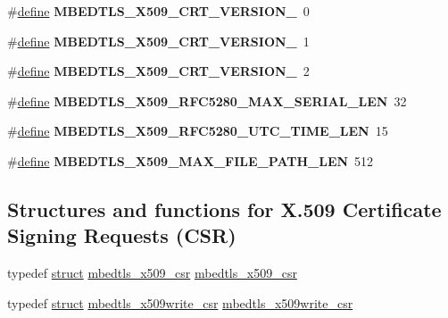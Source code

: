 \begin{DoxyCompactItemize}
$$\#\hyperlink{structdefine}{define} {\bfseries M\+B\+E\+D\+T\+L\+S\+\_\+\+X509\+\_\+\+C\+R\+T\+\_\+\+V\+E\+R\+S\+I\+O\+N\+\_}~0
\item 
\mbox{\label{group__x509__module_ga46a0b7f3a4c1f279f609fd8ea304c192}} 
\#\hyperlink{structdefine}{define} {\bfseries M\+B\+E\+D\+T\+L\+S\+\_\+\+X509\+\_\+\+C\+R\+T\+\_\+\+V\+E\+R\+S\+I\+O\+N\+\_}~1
\item 
\mbox{\label{group__x509__module_ga7c22a610222ea94e1faf96223bc5d9a4}} 
\#\hyperlink{structdefine}{define} {\bfseries M\+B\+E\+D\+T\+L\+S\+\_\+\+X509\+\_\+\+C\+R\+T\+\_\+\+V\+E\+R\+S\+I\+O\+N\+\_}~2
\item 
\mbox{\label{group__x509__module_ga189113155d9c64d4b4255b16761377c7}} 
\#\hyperlink{structdefine}{define} {\bfseries M\+B\+E\+D\+T\+L\+S\+\_\+\+X509\+\_\+\+R\+F\+C5280\+\_\+\+M\+A\+X\+\_\+\+S\+E\+R\+I\+A\+L\+\_\+\+L\+EN}~32
\item 
\mbox{\label{group__x509__module_ga533580091501768fa25d4d682febbb08}} 
\#\hyperlink{structdefine}{define} {\bfseries M\+B\+E\+D\+T\+L\+S\+\_\+\+X509\+\_\+\+R\+F\+C5280\+\_\+\+U\+T\+C\+\_\+\+T\+I\+M\+E\+\_\+\+L\+EN}~15
\item 
\mbox{\label{group__x509__module_ga4ebc833300be4f784ac13ff0a38085ce}} 
\#\hyperlink{structdefine}{define} {\bfseries M\+B\+E\+D\+T\+L\+S\+\_\+\+X509\+\_\+\+M\+A\+X\+\_\+\+F\+I\+L\+E\+\_\+\+P\+A\+T\+H\+\_\+\+L\+EN}~512
\end{DoxyCompactItemize}
\subsection*{Structures and functions for X.509 Certificate Signing Requests (C\+SR)}
\begin{DoxyCompactItemize}
\item 
typedef \hyperlink{interfacestruct}{struct} \hyperlink{structmbedtls__x509__csr}{mbedtls\+\_\+x509\+\_\+csr} \hyperlink{group__x509__module_gae481b23df67001bdac96ef9c2ab3ef7c}{mbedtls\+\_\+x509\+\_\+csr}
\item 
typedef \hyperlink{interfacestruct}{struct} \hyperlink{structmbedtls__x509write__csr}{mbedtls\+\_\+x509write\+\_\+csr} \hyperlink{group__x509__module_ga7b0b4f8c5cfd541ee20c53907edb636d}{mbedtls\+\_\+x509write\+\_\+csr}
\end{DoxyCompactItemize}


